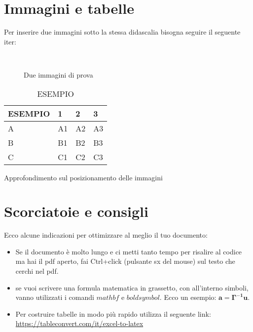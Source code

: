 \documentclass[envcountsame,envcountchap]{svmono}
\begin{document}
\section{Immagini e tabelle}

Per inserire due immagini sotto la stessa didascalia bisogna seguire il seguente iter:

\begin{figure}
    \centering
     \quad
     \\
\caption{Due immagini di prova}
\label{struttura}
\end{figure}

\begin{table}[!ht]
    \centering
    \caption{ESEMPIO}
    \begin{tabular}{llll}
    \hline
        ESEMPIO & 1 & 2 & 3 \\ \hline
        A & A1 & A2 & A3 \\ 
        B & B1 & B2 & B3 \\ 
        C & C1 & C2 & C3 \\ \hline
    \end{tabular}
    \label{ESEMPIO}
\end{table}

Approfondimento sul posizionamento delle immagini \citep{forceFigurePlacement}

\section{Scorciatoie e consigli}

Ecco alcune indicazioni per ottimizzare al meglio il tuo documento:

\begin{itemize}
    \item Se il documento è molto lungo e ci metti tanto tempo
    per risalire al codice ma hai il pdf aperto, 
    fai Ctrl+click (pulsante sx del mouse) sul testo che cerchi nel pdf.
    \item se vuoi scrivere una formula matematica in grassetto, con all'interno simboli, vanno utilizzati
    i comandi $mathbf$ e $boldsymbol$. Ecco un esempio: $\mathbf{a=\boldsymbol{\Gamma}^{-1}u}$.
    \item Per costruire tabelle in modo più rapido utilizza il seguente link: \url{https://tableconvert.com/it/excel-to-latex}
\end{itemize}
\end{document}
